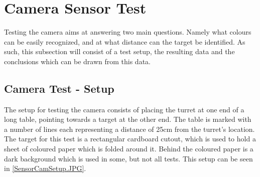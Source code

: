 %
%

\section{Camera Sensor Test}\label{CamTest}%
Testing the camera aims at answering two main questions. Namely
what colours can be easily recognized, and at what distance can the target be
identified. As such, this subsection will consist of a test setup, the resulting
data and the conclusions which can be drawn from this data.

\subsection{Camera Test - Setup}\label{CamTestSetup}
The setup for testing the camera consists of placing the turret at one end of a
long table, pointing towards a target at the other end. The table is marked with
a number of lines each representing a distance of 25cm from the turret's
location. The target for this test is a rectangular cardboard cutout, which is
used to hold a sheet of coloured paper which is folded around it. Behind the
coloured paper is a dark background which is used in some, but not all tests.
This setup can be seen in \autoref{SensorCamSetup.JPG}.

